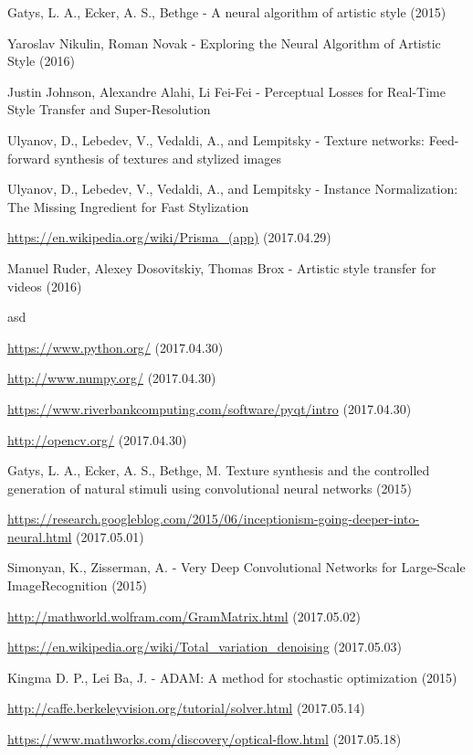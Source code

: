 \documentclass[12pt, a4paper, oneside]{book}
\theoremstyle{tetel}
\begin{document}
\begin{thebibliography}{1}
Gatys, L. A., Ecker, A. S., Bethge - A neural algorithm of artistic style (2015)

Yaroslav Nikulin, Roman Novak - Exploring the Neural Algorithm of Artistic Style (2016)

Justin Johnson, Alexandre Alahi, Li Fei-Fei - Perceptual Losses for Real-Time Style Transfer and Super-Resolution

Ulyanov, D., Lebedev, V., Vedaldi, A., and Lempitsky - Texture networks: Feed-forward synthesis of textures and stylized images

Ulyanov, D., Lebedev, V., Vedaldi, A., and Lempitsky - Instance Normalization: The Missing Ingredient for Fast Stylization

\url{https://en.wikipedia.org/wiki/Prisma_(app)} (2017.04.29)

Manuel Ruder, Alexey Dosovitskiy, Thomas Brox - Artistic style transfer for videos (2016)

asd

\url{https://www.python.org/} (2017.04.30)

\url{http://www.numpy.org/} (2017.04.30)

\url{https://www.riverbankcomputing.com/software/pyqt/intro} (2017.04.30)

\url{http://opencv.org/} (2017.04.30)

Gatys, L. A., Ecker, A. S., Bethge, M. Texture synthesis and the controlled generation of natural stimuli using convolutional neural networks (2015)

\url{https://research.googleblog.com/2015/06/inceptionism-going-deeper-into-neural.html} (2017.05.01)

Simonyan, K., Zisserman, A. - Very Deep Convolutional Networks for Large-Scale ImageRecognition (2015)

\url{http://mathworld.wolfram.com/GramMatrix.html} (2017.05.02)

\url{https://en.wikipedia.org/wiki/Total_variation_denoising} (2017.05.03)

Kingma D. P., Lei Ba, J. - ADAM: A method for stochastic optimization (2015)

\url{http://caffe.berkeleyvision.org/tutorial/solver.html} (2017.05.14)

\url{https://www.mathworks.com/discovery/optical-flow.html} (2017.05.18)


\end{thebibliography}
\end{document}
